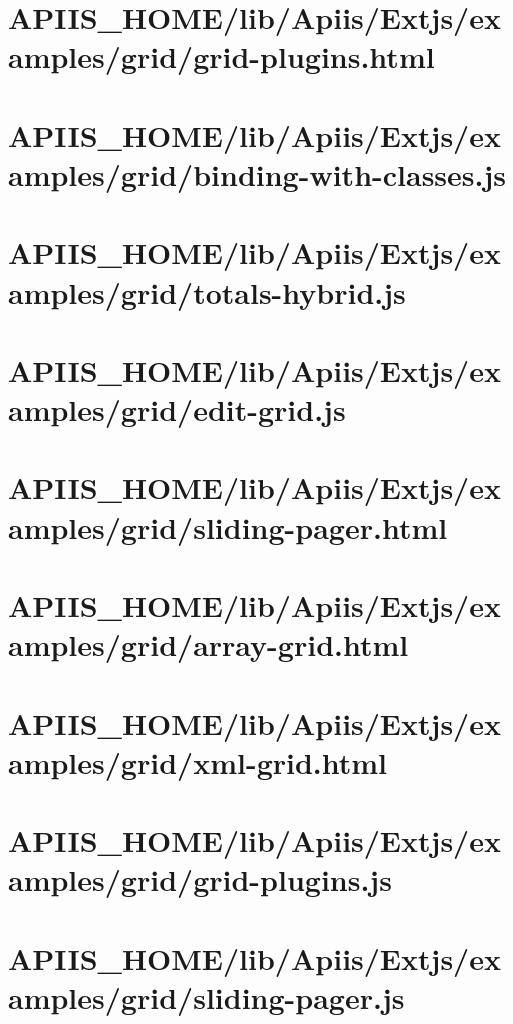 \section{APIIS\_HOME/lib/Apiis/Extjs/examples/grid/grid-plugins.html} 
\section{APIIS\_HOME/lib/Apiis/Extjs/examples/grid/binding-with-classes.js} 
\section{APIIS\_HOME/lib/Apiis/Extjs/examples/grid/totals-hybrid.js} 
\section{APIIS\_HOME/lib/Apiis/Extjs/examples/grid/edit-grid.js} 
\section{APIIS\_HOME/lib/Apiis/Extjs/examples/grid/sliding-pager.html} 
\section{APIIS\_HOME/lib/Apiis/Extjs/examples/grid/array-grid.html} 
\section{APIIS\_HOME/lib/Apiis/Extjs/examples/grid/xml-grid.html} 
\section{APIIS\_HOME/lib/Apiis/Extjs/examples/grid/grid-plugins.js} 
\section{APIIS\_HOME/lib/Apiis/Extjs/examples/grid/sliding-pager.js} 
